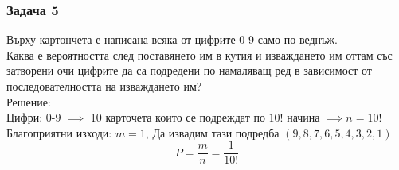 \documentclass[fleqn, 12pt]{article}
\theoremstyle{definition}
\begin{document}
\subsubsection*{Задача 5}
Върху картончета е написана всяка от цифрите 0-9 само по веднъж.\\
Каква е вероятността след поставянето им в кутия и изваждането им оттам със затворени очи цифрите да са подредени по намаляващ ред в зависимост от последователността на изваждането им? \\
Решение: \\
Цифри: 0-9 $\implies$ 10 карточета които се подреждат по $10!$ начина $\implies n = 10!$ \\
Благоприятни изходи: $m = 1$, Да извадим тази подредба $(9,8,7,6,5,4,3,2,1)$ \\
$$P =  \frac{m}{n} = \frac{1}{10!} $$
\end{document}

